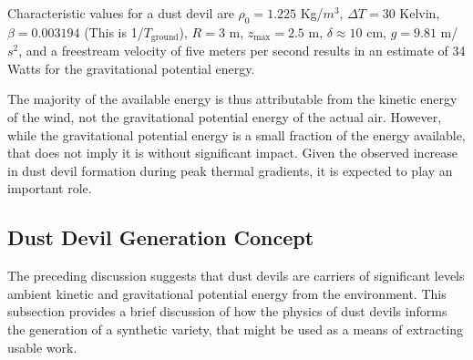 %
% 
%
%
%


Characteristic values for a dust devil are $\rho_0 = 1.225$ Kg/$m^3$, 
$\Delta T= 30$ Kelvin, $\beta = 0.003194$ (This is 1/$T_{\text{ground}}$), 
$R = 3 $ m, $z_\text{max} = 2.5$ m, $\delta \approx 10$ cm, $g=9.81$ m/$s^2$, and a
freestream velocity of five meters per second results in an estimate of 34 Watts %
for the gravitational potential energy. 

The majority of the available energy is thus attributable from the
kinetic energy of the wind, not the gravitational potential energy of
the actual air. 
However, while the gravitational potential energy is a small fraction of
the energy available, that does not imply it is without significant
impact. 
Given the observed increase in dust devil formation during peak thermal
gradients, it is expected to play an important role. 

\subsection{Dust Devil Generation Concept}

The preceding discussion suggests that 
dust devils are carriers of significant levels ambient kinetic and
gravitational potential energy from the environment. This  
subsection provides a brief discussion of how the physics of 
dust devils informs the generation of a synthetic variety, that might be
used as a means of extracting usable work.  

